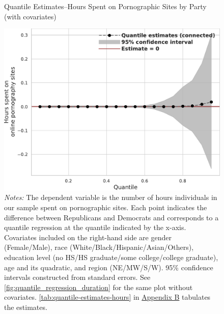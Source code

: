 \documentclass[12pt,twoside]{article}
\begin{document}
\begin{figure}[!ht]
	\centering
	\caption{Quantile Estimates--Hours Spent on Pornographic Sites by Party (with covariates)}
	\includegraphics[width=.7\linewidth]{figs/quantile_reg_covariates_duration_adult.pdf}
	\caption*{\footnotesize \emph{Notes:} 
		The dependent variable is the number of hours individuals in our sample spent on pornographic sites.
		Each point indicates the difference between Republicans and Democrats and corresponds to a quantile regression at the quantile indicated by the x-axis.
		Covariates included on the right-hand side are gender (Female/Male), race (White/Black/Hispanic/Asian/Others), education level (no HS/HS graduate/some college/college graduate), age and its quadratic, and region (NE/MW/S/W).
		95\% confidence intervals constructed from standard errors.
		See \cref{fig:quantile_regression_duration} for the same plot without covariates.
  \cref{tab:quantile-estimates-hours} in \hyperref[sm:smB]{Appendix B} tabulates the estimates.
	}
	\label{fig:quantile_regression_duration_covariates}
\end{figure}
\end{document}
